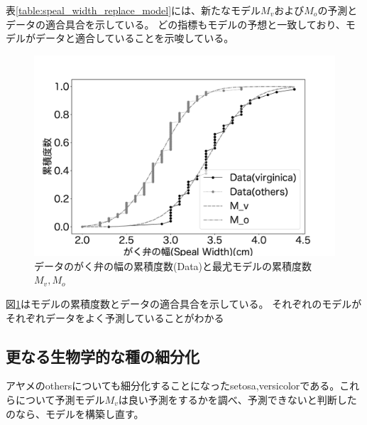 表\ref{table:speal_width_replace_model}には、新たなモデル$M_v$および$M_o$の予測とデータの適合具合を示している。
どの指標もモデルの予想と一致しており、モデルがデータと適合していることを示唆している。

\begin{figure}
    \begin{center}
        \includegraphics[width=15cm]{./image/15_/speal_width_viri_model.pdf}
        \caption{データのがく弁の幅の累積度数(Data)と最尤モデルの累積度数$M_v,M_o$}
        \label{fig:speal_width_viri_model}
    \end{center}
\end{figure}

図\ref{fig:speal_width_viri_model}はモデルの累積度数とデータの適合具合を示している。
それぞれのモデルがそれぞれデータをよく予測していることがわかる

\subsection{更なる生物学的な種の細分化}
アヤメのothersについても細分化することになったsetosa,versicolorである。これらについて予測モデル$M_v$は良い予測をするかを調べ、予測できないと判断したのなら、モデルを構築し直す。

